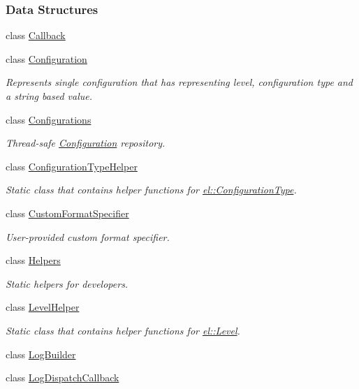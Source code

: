 \subsubsection*{Data Structures}
\begin{DoxyCompactItemize}
\item 
class \hyperlink{a00008}{Callback}
\item 
class \hyperlink{a00013}{Configuration}
\begin{DoxyCompactList}\small\item\em Represents single configuration that has representing level, configuration type and a string based value. \end{DoxyCompactList}\item 
class \hyperlink{a00014}{Configurations}
\begin{DoxyCompactList}\small\item\em Thread-\/safe \hyperlink{a00013}{Configuration} repository. \end{DoxyCompactList}\item 
class \hyperlink{a00015}{Configuration\+Type\+Helper}
\begin{DoxyCompactList}\small\item\em Static class that contains helper functions for \hyperlink{a00183_a281f5db6d6163678bc68a8b23b59e124}{el\+::\+Configuration\+Type}. \end{DoxyCompactList}\item 
class \hyperlink{a00017}{Custom\+Format\+Specifier}
\begin{DoxyCompactList}\small\item\em User-\/provided custom format specifier. \end{DoxyCompactList}\item 
class \hyperlink{a00035}{Helpers}
\begin{DoxyCompactList}\small\item\em Static helpers for developers. \end{DoxyCompactList}\item 
class \hyperlink{a00037}{Level\+Helper}
\begin{DoxyCompactList}\small\item\em Static class that contains helper functions for \hyperlink{a00183_ab0ac6091262344c52dd2d3ad099e8e36}{el\+::\+Level}. \end{DoxyCompactList}\item 
class \hyperlink{a00042}{Log\+Builder}
\item 
class \hyperlink{a00043}{Log\+Dispatch\+Callback}

\end{DoxyCompactItemize}
